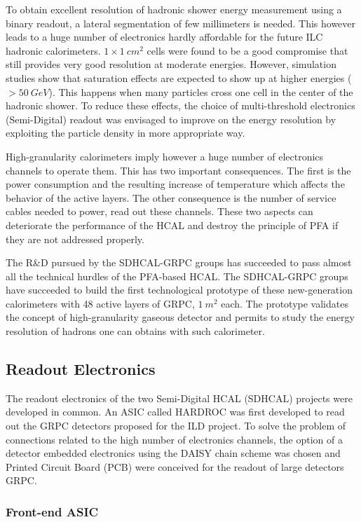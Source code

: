 To obtain excellent resolution of hadronic shower energy measurement using a
binary readout, a lateral segmentation of few millimeters is needed. This
however leads to a huge number of electronics hardly affordable for the future
ILC hadronic calorimeters. $1\times \SI{1}{cm^2}$ cells were found to be a good compromise
that still provides very good resolution at moderate energies. However,
simulation studies show that saturation effects are expected to show up at
higher energies ($> \SI{50}{GeV}$). This happens when many particles cross
one cell in the center of the hadronic shower. To reduce these effects, the
choice of multi-threshold electronics (Semi-Digital) readout was envisaged to
improve on the energy resolution by exploiting the particle density in more
appropriate way.

High-granularity calorimeters imply however a huge number of electronics
channels to operate them. This has two important consequences. The first is the
power consumption and the resulting increase of temperature which affects the
behavior of the active layers. The other consequence is the number of service
cables needed to power, read out these channels. These two aspects can
deteriorate the performance of the HCAL and destroy the principle of PFA if
they are not addressed properly.

The R\&D pursued by the SDHCAL-GRPC groups has succeeded to pass almost all the
technical hurdles of the PFA-based HCAL. The SDHCAL-GRPC groups have succeeded
to build the first technological prototype of these new-generation calorimeters
with 48 active layers of GRPC, $\SI{1}{m^2}$ each. The prototype validates the concept
of high-granularity gaseous detector and permits to study the energy resolution
of hadrons one can obtains with such calorimeter.


\subsection{Readout Electronics}

The readout electronics of the two Semi-Digital HCAL (SDHCAL) projects were
developed in common. An ASIC called HARDROC was first developed to read out the
GRPC detectors proposed for the ILD project. To solve the problem of
connections related to the high number of electronics channels, the option of a
detector embedded electronics using the DAISY chain scheme was chosen and
Printed Circuit Board (PCB) were conceived for the readout of large detectors
GRPC.

\subsubsection{Front-end ASIC}

